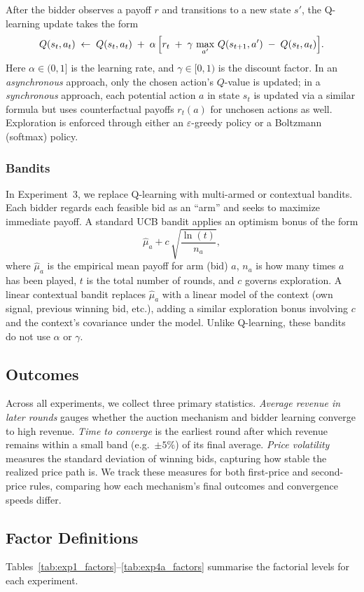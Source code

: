 After the bidder observes a payoff $r$ and transitions to a new state $s'$, the Q-learning update takes the form
\[
Q(s_t,a_t)
\;\leftarrow\;Q(s_t,a_t)\;+\;\alpha\,\Bigl[
r_t \;+\;\gamma\,\max_{a'}\,Q(s_{t+1},a') 
\;-\;Q(s_t,a_t)\Bigr].
\]
Here $\alpha \in (0,1]$ is the learning rate, and $\gamma \in [0,1)$ is the discount factor. In an \emph{asynchronous} approach, only the chosen action’s $Q$-value is updated; in a \emph{synchronous} approach, each potential action $a$ in state $s_t$ is updated via a similar formula but uses counterfactual payoffs $r_t(a)$ for unchosen actions as well. Exploration is enforced through either an $\varepsilon$-greedy policy or a Boltzmann (softmax) policy.

\subsubsection{Bandits}
In Experiment~3, we replace Q-learning with multi-armed or contextual bandits. Each bidder regards each feasible bid as an “arm” and seeks to maximize immediate payoff. A standard UCB bandit applies an optimism bonus of the form
\[
\hat{\mu}_a + c\,\sqrt{\frac{\ln(t)}{n_a}},
\]
where $\hat{\mu}_a$ is the empirical mean payoff for arm (bid) $a$, $n_a$ is how many times $a$ has been played, $t$ is the total number of rounds, and $c$ governs exploration. A linear contextual bandit replaces $\hat{\mu}_a$ with a linear model of the context (own signal, previous winning bid, etc.), adding a similar exploration bonus involving $c$ and the context’s covariance under the model. Unlike Q-learning, these bandits do not use $\alpha$ or $\gamma$.

\subsection{Outcomes}
Across all experiments, we collect three primary statistics. \emph{Average revenue in later rounds} gauges whether the auction mechanism and bidder learning converge to high revenue. \emph{Time to converge} is the earliest round after which revenue remains within a small band (e.g.\ $\pm5\%$) of its final average. \emph{Price volatility} measures the standard deviation of winning bids, capturing how stable the realized price path is. We track these measures for both first-price and second-price rules, comparing how each mechanism’s final outcomes and convergence speeds differ.

\subsection{Factor Definitions}
Tables~\ref{tab:exp1_factors}--\ref{tab:exp4a_factors} summarise the factorial levels for each experiment.

